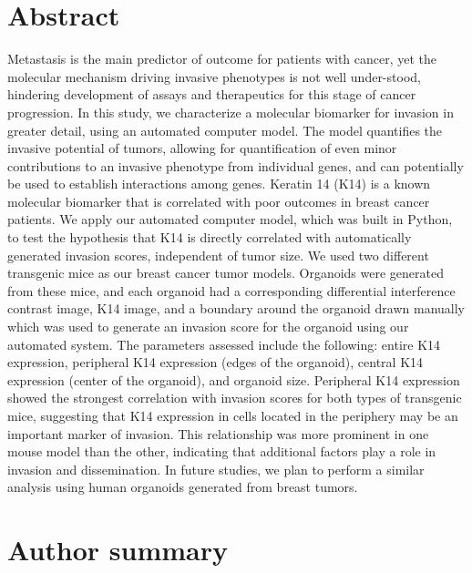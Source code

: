 \documentclass[10pt,letterpaper]{article}
\begin{document}
\section*{Abstract}
Metastasis is the main predictor of outcome for patients with cancer, yet the molecular mechanism driving invasive phenotypes is not well under-stood, hindering development of assays and therapeutics for this stage of cancer progression. In this study, we characterize a molecular biomarker for invasion in greater detail, using an automated computer model. The model quantifies the invasive potential of tumors, allowing for quantification of even minor contributions to an invasive phenotype from individual genes, and can potentially be used to establish interactions among genes. Keratin 14 (K14) is a known molecular biomarker that is correlated with poor outcomes in breast cancer patients. We apply our automated computer model, which was built in Python, to test the hypothesis that K14 is directly correlated with automatically generated invasion scores, independent of tumor size. We used two different transgenic mice as our breast cancer tumor models. Organoids were generated from these mice, and each organoid had a corresponding differential interference contrast image, K14 image, and a boundary around the organoid drawn manually which was used to generate an invasion score for the organoid using our automated system. The parameters assessed include the following: entire K14 expression, peripheral K14 expression (edges of the organoid), central K14 expression (center of the organoid), and organoid size. Peripheral K14 expression showed the strongest correlation with invasion scores for both types of transgenic mice, suggesting that K14 expression in cells located in the periphery may be an important marker of invasion. This relationship was more prominent in one mouse model than the other, indicating that additional factors play a role in invasion and dissemination. In future studies, we plan to perform a similar analysis using human organoids generated from breast tumors.


\section*{Author summary}

\linenumbers

\end{document}
